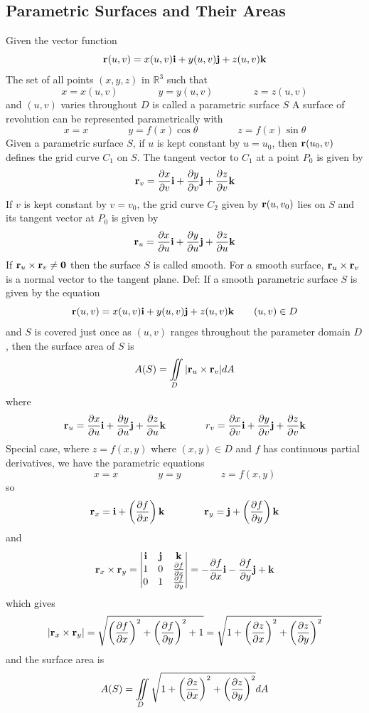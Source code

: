 \documentclass{article}
\begin{document}
    \subsection{Parametric Surfaces and Their Areas}
    \begin{outline}
        \1 Given the vector function \[\vb r(u,v)=x(u,v)\vb i+y(u,v)\vb j+z(u,v)\vb k\] The set of all points \((x,y,z)\) in \(\mathbb R^3\) such that \[x=x(u,v)\qquad\qquad y=y(u,v)\qquad\qquad z=z(u,v)\] and \((u,v)\) varies throughout $D$ is called a parametric surface $S$
        \1 A surface of revolution can be represented parametrically with \[x=x\qquad\qquad y=f(x)\cos\theta\qquad\qquad z=f(x)\sin\theta\]
        \1 Given a parametric surface $S$, if \(u\) is kept constant by \(u=u_0\), then \(\vb r(u_0,v)\) defines the grid curve \(C_1\) on \(S\). The tangent vector to \(C_1\) at a point \(P_0\) is given by \[\vb r_v=\pdv{x}{v}(u_0,v_0)\vb i+\pdv{y}{v}(u_0,v_0)\vb j+\pdv{z}{v}(u_0,v_0)\vb k\] If $v$ is kept constant by \(v=v_0\), the grid curve \(C_2\) given by \(\vb r(u,v_0)\) lies on $S$ and its tangent vector at \(P_0\) is given by \[\vb r_u=\pdv{x}{u}(u_0,v_0)\vb i+\pdv{y}{u}(u_0,v_0)\vb j+\pdv{z}{u}(u_0,v_0)\vb k\] If \(\vb r_u\times\vb r_v\neq\vb 0\) then the surface $S$ is called smooth. For a smooth surface, \(\vb r_u\times\vb r_v\) is a normal vector to the tangent plane. 
        \1 Def: If a smooth parametric surface $S$ is given by the equation \[\vb r(u,v)=x(u,v)\vb i+y(u,v)\vb j+z(u,v)\vb k\qquad(u,v)\in D\] and $S$ is covered just once as \((u,v)\) ranges throughout the parameter domain $D$, then the surface area of $S$ is \[A(S)=\iint\limits_D|\vb r_u\times\vb r_v|dA\] where \[\vb r_u=\pdv{x}{u}\vb i+\pdv{y}{u}\vb j+\pdv{z}{u}\vb k\qquad\qquad r_v=\pdv{x}{v}\vb i+\pdv{y}{v}\vb j+\pdv{z}{v}\vb k\]
        \1 Special case, where \(z=f(x,y)\) where \((x,y)\in D\) and \(f\) has continuous partial derivatives, we have the parametric equations \[x=x\qquad\qquad y=y\qquad\qquad z=f(x,y)\] so \[\vb r_x=\vb i+\left(\pdv{f}{x}\right)\vb k\qquad\qquad\vb r_y=\vb j+\left(\pdv{f}{y}\right)\vb k\] and \[\vb r_x\times\vb r_y=\begin{vmatrix}\vb i & \vb j & \vb k \\ 1 & 0 & \pdv{f}{x} \\ 0 & 1 & \pdv{f}{y}\end{vmatrix}=-\pdv{f}{x}\vb i-\pdv{f}{y}\vb j+\vb k\] which gives \[|\vb r_x\times\vb r_y|=\sqrt{\left(\pdv{f}{x}\right)^2+\left(\pdv{f}{y}\right)^2+1}=\sqrt{1+\left(\pdv{z}{x}\right)^2+\left(\pdv{z}{y}\right)^2}\] and the surface area is \[A(S)=\iint\limits_D\sqrt{1+\left(\pdv{z}{x}\right)^2+\left(\pdv{z}{y}\right)^2}dA\]

    \end{outline}
\end{document}
